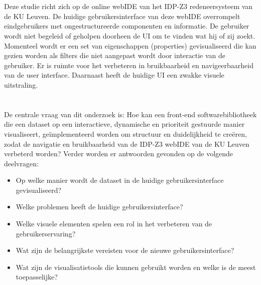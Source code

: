 \section{}%
\label{sec:probleemstelling}
Deze studie richt zich op de online webIDE van het IDP-Z3 redeneersysteem van de KU Leuven. De huidige gebruikersinterface van deze webIDE overrompelt eindgebruikers met ongestructureerde componenten en informatie. De gebruiker wordt niet begeleid of geholpen doorheen de UI om te vinden wat hij of zij zoekt. Momenteel wordt er een set van eigenschappen (properties) gevisualiseerd die kan gezien worden als filters die niet aangepast wordt door interactie van de gebruiker. Er is ruimte voor het verbeteren in bruikbaarheid en navigeerbaarheid van de user interface. Daarnaast heeft de huidige UI een zwakke visuele uitstraling.


\section{}%
\label{sec:onderzoeksvraag}
De centrale vraag van dit onderzoek is: Hoe kan een front-end softwarebibliotheek die een dataset op een interactieve, dynamische en prioriteit gestuurde manier visualiseert, geïmplementeerd worden om structuur en duidelijkheid te creëren, zodat de navigatie en bruikbaarheid van de IDP-Z3 webIDE van de KU Leuven verbeterd worden? Verder worden er antwoorden gevonden op de volgende deelvragen:
\begin{itemize}
    \item Op welke manier wordt de dataset in de huidige gebruikersinterface gevisualiseerd?
    \item Welke problemen heeft de huidige gebruikersinterface?
    \item Welke visuele elementen spelen een rol in het verbeteren van de gebruikerservaring?
    \item Wat zijn de belangrijkste vereisten voor de nieuwe gebruikersinterface?
    \item Wat zijn de visualisatietools die kunnen gebruikt worden en welke is de meest toepasselijke?
\end{itemize}

